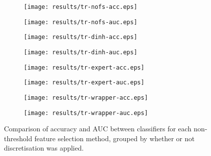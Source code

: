 \begin{figure*}[htbp]
\begin{subfigure}{.50\textwidth}
\texttt{[image: results/tr-nofs-acc.eps]}
\caption{}
\label{}
\end{subfigure}%
\begin{subfigure}{.57\textwidth}
\texttt{[image: results/tr-nofs-auc.eps]}
\caption{}
\label{}
\end{subfigure}

\begin{subfigure}{.50\textwidth}
\texttt{[image: results/tr-dinh-acc.eps]}
\caption{}
\label{}
\end{subfigure}%
\begin{subfigure}{.57\textwidth}
\texttt{[image: results/tr-dinh-auc.eps]}
\caption{}
\label{}
\end{subfigure}

\begin{subfigure}{.50\textwidth}
\texttt{[image: results/tr-expert-acc.eps]}
\caption{}
\label{}
\end{subfigure}%
\begin{subfigure}{.57\textwidth}
\texttt{[image: results/tr-expert-auc.eps]}
\caption{}
\label{}
\end{subfigure}

\begin{subfigure}{.50\textwidth}
\texttt{[image: results/tr-wrapper-acc.eps]}
\caption{}
\label{}
\end{subfigure}%
\begin{subfigure}{.57\textwidth}
\texttt{[image: results/tr-wrapper-auc.eps]}
\caption{}
\label{}
\end{subfigure}
\caption[]{Comparison of accuracy and AUC between classifiers for each non-threshold feature selection method, grouped by whether or not discretisation was applied.}
\label{}
\end{figure*}
